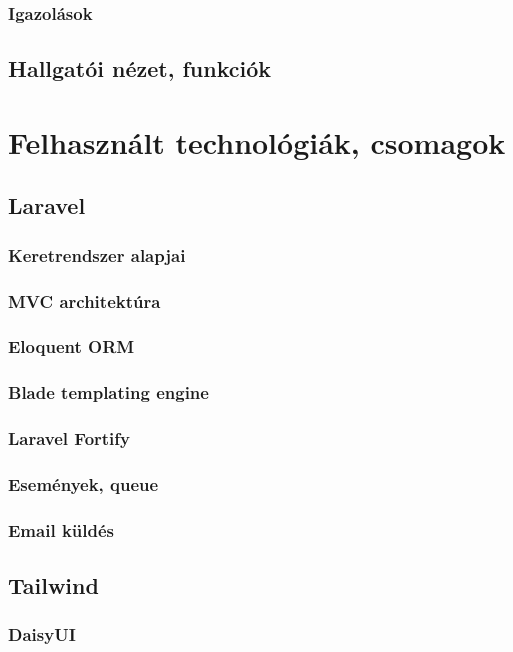 \documentclass[
]{thesis-ekf}
\theoremstyle{definition}
\theoremstyle{remark}
\begin{document}
\subsection{Igazolások}



\section{Hallgatói nézet, funkciók}

\chapter{Felhasznált technológiák, csomagok}

\section{Laravel}
\subsection{Keretrendszer alapjai}
\subsection{MVC architektúra}
\subsection{Eloquent ORM}
\subsection{Blade templating engine}
\subsection{Laravel Fortify}
\subsection{Események, queue}
\subsection{Email küldés}

\section{Tailwind}
\subsection{DaisyUI}
\end{document}
